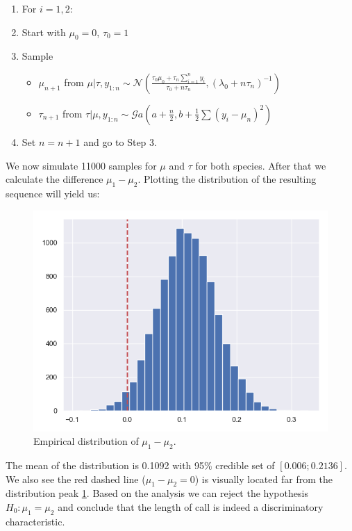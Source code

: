 \documentclass[a4 paper]{article}
\begin{document}
\begin{enumerate}
	\item For $i=1,2$:

	\item Start with $\mu_0=0$, $\tau_0=1$
	
	\item Sample
	\begin{itemize}
		\item $\mu_{n+1}$ from $\mu|\tau,y_{1:n} \sim\mathcal{N}\left(\frac{\tau_{0}\mu_{0}+\tau_n\sum_{i=1}^{n}y_{i}}{\tau_{0}+n\tau_n},\left(\lambda_{0}+n\tau_n\right)^{-1}\right)$
		
		\item $\tau_{n+1}$ from $\tau|\mu,y_{1:n} \sim\mathcal{G}a\left(a+\frac{n}{2},b+\frac{1}{2}\sum\left(y_{i}-\mu_n\right)^{2}\right)$
	\end{itemize}
	
	
	\item Set $n =n+1$ and go to Step 3.
	
\end{enumerate}


We now simulate 11000 samples for $\mu$ and $\tau$ 
for both species. After that we 
calculate the difference $\mu_1-\mu_2$.
Plotting the distribution of the 
resulting sequence will yield us:  

\begin{figure}[H]
	\includegraphics[scale=0.5]{dist}
	\centering
	\caption{Empirical distribution of $\mu_1-\mu_2$.}
	\label{dist}
\end{figure}

The mean of the distribution is 0.1092
with 95\% credible set of $[0.006;0.2136]$.
We also see the red dashed line ($\mu_1-\mu_2=0$)
is visually located far from the 
distribution peak \ref{dist}.
Based on the analysis we can reject 
the hypothesis $H_0: \mu_1=\mu_2$
and conclude that  the length of call is 
indeed a
discriminatory characteristic. \newline
\end{document}
